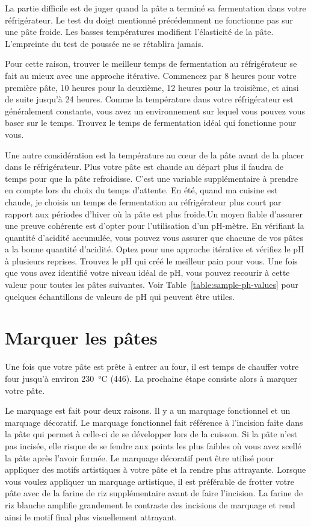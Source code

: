 La partie difficile est de juger quand la pâte a terminé sa fermentation dans votre réfrigérateur.
Le test du doigt mentionné précédemment ne fonctionne pas sur une pâte froide. Les basses
températures modifient l'élasticité de la pâte. L'empreinte du test de poussée
ne se rétablira jamais.

Pour cette raison, trouver le meilleur temps de fermentation au réfrigérateur se fait au mieux 
avec une approche itérative. Commencez par 8 heures pour votre première pâte, 
10 heures pour la deuxième, 12 heures pour la troisième, et ainsi de suite jusqu'à 24 heures. 
Comme la température dans votre réfrigérateur est généralement constante, vous avez un 
environnement sur lequel vous pouvez vous baser sur le temps. Trouvez le temps de fermentation 
idéal qui fonctionne pour vous.

Une autre considération est la température au cœur de la pâte avant 
de la placer dans le réfrigérateur. Plus votre pâte est chaude au départ 
plus il faudra de temps pour que la pâte refroidisse. C'est une variable supplémentaire 
à prendre en compte lors du choix du temps d'attente. En été, quand ma cuisine est chaude, 
je choisis un temps de fermentation au réfrigérateur plus court par rapport aux périodes 
d'hiver où la pâte est plus froide.Un moyen fiable d'assurer une preuve cohérente est d'opter pour l'utilisation d'un pH-mètre. En vérifiant la quantité d'acidité accumulée, vous pouvez vous assurer que chacune de vos pâtes a la bonne quantité d'acidité. Optez pour une approche itérative et vérifiez le pH à plusieurs reprises. Trouvez le pH qui créé le meilleur pain pour vous. Une fois que vous avez identifié votre niveau idéal de pH, vous pouvez recourir à cette valeur pour toutes les pâtes suivantes. Voir Table~\ref{table:sample-ph-values} pour quelques échantillons de valeurs de pH qui peuvent être utiles.

\section{Marquer les pâtes}

Une fois que votre pâte est prête à entrer au four, il est temps de chauffer votre four jusqu'à environ \qty{230}{\degreeCelsius} (\qty{446}{\degF}). La prochaine étape consiste alors à marquer votre pâte.

Le marquage est fait pour deux raisons. Il y a un marquage fonctionnel et un marquage décoratif. Le marquage fonctionnel fait référence à l'incision faite dans la pâte qui permet à celle-ci de se développer lors de la cuisson. Si la pâte n'est pas incisée, elle risque de se fendre aux points les plus faibles où vous avez scellé la pâte après l'avoir formée. Le marquage décoratif peut être utilisé pour appliquer des motifs artistiques à votre pâte et la rendre plus attrayante. Lorsque vous voulez appliquer un marquage artistique, il est préférable de frotter votre pâte avec de la farine de riz supplémentaire avant de faire l'incision. La farine de riz blanche amplifie grandement le contraste des incisions de marquage et rend ainsi le motif final plus visuellement attrayant.

